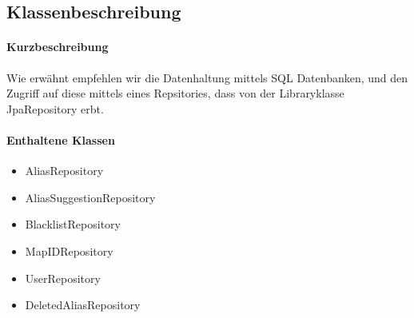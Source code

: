 \subsection*{Klassenbeschreibung}%
\paragraph*{Kurzbeschreibung}
Wie erwähnt empfehlen wir die Datenhaltung mittels SQL Datenbanken, und den Zugriff auf diese mittels eines Repsitories,
dass von der Libraryklasse \dq JpaRepository\dq{} erbt.

\paragraph*{Enthaltene Klassen}
\begin{itemize}
    \item AliasRepository
    \item AliasSuggestionRepository
    \item BlacklistRepository
    \item MapIDRepository
    \item UserRepository
    \item DeletedAliasRepository
\end{itemize}
